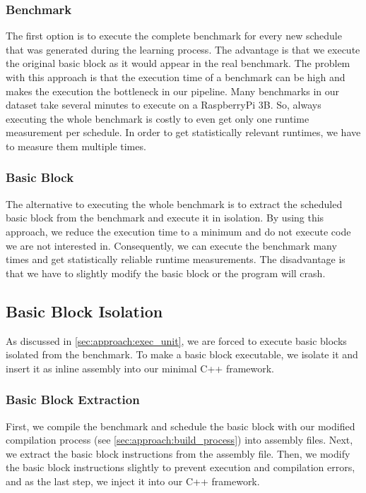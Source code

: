 \subsubsection{Benchmark}
The first option is to execute the complete benchmark for every new schedule that was generated during the learning process.
The advantage is that we execute the original basic block as it would appear in the real benchmark.
The problem with this approach is that the execution time of a benchmark can be high and makes the execution the bottleneck in our pipeline.
Many benchmarks in our dataset take several minutes to execute on a RaspberryPi 3B.
So, always executing the whole benchmark is costly to even get only one runtime measurement per schedule.
In order to get statistically relevant runtimes, we have to measure them multiple times.

\subsubsection{Basic Block}
The alternative to executing the whole benchmark is to extract the scheduled basic block from the benchmark and execute it in isolation.
By using this approach, we reduce the execution time to a minimum and do not execute code we are not interested in.
Consequently, we can execute the benchmark many times and get statistically reliable runtime measurements.
The disadvantage is that we have to slightly modify the basic block or the program will crash.

\subsection{Basic Block Isolation}
\label{sec:approach:bbisolation}
As discussed in \cref{sec:approach:exec_unit}, we are forced to execute basic blocks isolated from the benchmark.
To make a basic block executable, we isolate it and insert it as inline assembly into our minimal C++ framework.

\subsubsection{Basic Block Extraction}
First, we compile the benchmark and schedule the basic block with our modified compilation process (see \cref{sec:approach:build_process}) into assembly files.
Next, we extract the basic block instructions from the assembly file.
Then, we modify the basic block instructions slightly to prevent execution and compilation errors, and as the last step, we inject it into our C++ framework.


